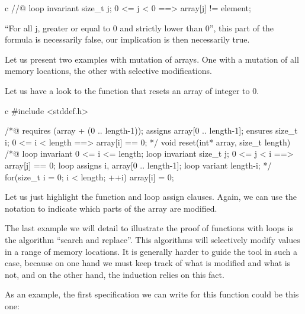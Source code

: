 \documentclass[middle]{zmdocument}
\begin{document}
\begin{CodeBlock}{c}
//@ loop invariant \forall size_t j; 0 <= j < 0 ==> array[j] != element;
\end{CodeBlock}



``For all j, greater or equal to 0 and strictly lower than 0'', this
part of the formula is necessarily false, our implication is then
necessarily true.





Let us present two examples with mutation of arrays. One with a mutation
of all memory locations, the other with selective modifications.





Let us have a look to the function that resets an array of integer to 0.



\begin{CodeBlock}{c}
#include <stddef.h>

/*@
  requires \valid(array + (0 .. length-1));
  assigns  array[0 .. length-1];
  ensures  \forall size_t i; 0 <= i < length ==> array[i] == 0;
*/
void reset(int* array, size_t length){
  /*@
    loop invariant 0 <= i <= length;
    loop invariant \forall size_t j; 0 <= j < i ==> array[j] == 0;
    loop assigns i, array[0 .. length-1];
    loop variant length-i;
  */
  for(size_t i = 0; i < length; ++i)
    array[i] = 0;
}
\end{CodeBlock}



Let us just highlight the function and loop assign clauses. Again, we
can use the notation  to indicate which parts of the
array are modified.





The last example we will detail to illustrate the proof of functions
with loops is the algorithm ``search and replace''. This algorithms will
selectively modify values in a range of memory locations. It is
generally harder to guide the tool in such a case, because on one hand
we must keep track of what is modified and what is not, and on the other
hand, the induction relies on this fact.

As an example, the first specification we can write for this function
could be this one:
\end{document}
